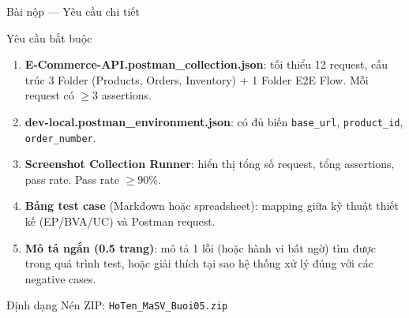 \documentclass[aspectratio=169,10pt]{beamer}
\begin{document}
\begin{frame}[fragile]{Bài nộp --- Yêu cầu chi tiết}
  \begin{block}{Yêu cầu bắt buộc}
    \begin{enumerate}
      \item \textbf{E-Commerce-API.postman\_collection.json}:
        tối thiểu 12 request, cấu trúc 3 Folder (Products, Orders, Inventory)
        $+$ 1 Folder E2E Flow.
        Mỗi request có $\geq 3$ assertions.

      \item \textbf{dev-local.postman\_environment.json}:
        có đủ biến \texttt{base\_url}, \texttt{product\_id},
        \texttt{order\_number}.

      \item \textbf{Screenshot Collection Runner}: hiển thị tổng số request,
        tổng assertions, pass rate. Pass rate $\geq 90\%$.

      \item \textbf{Bảng test case} (Markdown hoặc spreadsheet):
        mapping giữa kỹ thuật thiết kế (EP/BVA/UC) và Postman request.

      \item \textbf{Mô tả ngắn (0.5 trang)}: mô tả 1 lỗi (hoặc hành vi bất ngờ)
        tìm được trong quá trình test, hoặc giải thích tại sao hệ thống
        xử lý đúng với các negative cases.
    \end{enumerate}
  \end{block}

  \begin{alertblock}{Định dạng}
    Nén ZIP: \texttt{HoTen\_MaSV\_Buoi05.zip}
  \end{alertblock}
\end{frame}
\end{document}
